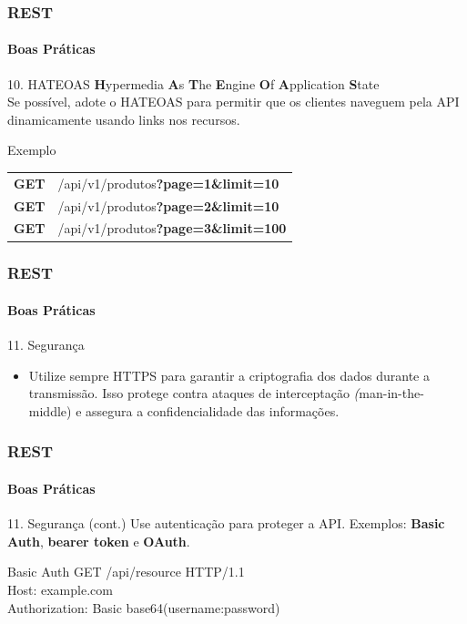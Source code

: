 \documentclass[
	10pt, %
	t, %
]{beamer}
\newcommand{\yellowbox}[1]{\colorbox{yellow!75}{#1}}
\begin{document}
\begin{frame}
	\frametitle{REST}
	\framesubtitle{Boas Práticas}

	\begin{block}{10. HATEOAS}
		\textbf{H}ypermedia \textbf{A}s \textbf{T}he \textbf{E}ngine \textbf{O}f \textbf{A}pplication \textbf{S}tate \\
		Se possível, adote o HATEOAS para permitir que os clientes naveguem pela API dinamicamente usando links nos recursos.
	\end{block}

	\begin{exampleblock}{Exemplo}
		\begin{tabular}{@{}ll@{}}
			\textbf{GET}    &  \yellowbox{/api/v1/produtos\textbf{?page=1\&limit=10}} \\
			\textbf{GET}    &  \yellowbox{/api/v1/produtos\textbf{?page=2\&limit=10}} \\
			\textbf{GET}    &  \yellowbox{/api/v1/produtos\textbf{?page=3\&limit=100}} \\
		\end{tabular}
	\end{exampleblock}

\end{frame}

\begin{frame}
	\frametitle{REST}
	\framesubtitle{Boas Práticas}
	
	\begin{block}{11. Segurança}
		\begin{itemize}
			\item Utilize sempre HTTPS para garantir a criptografia dos dados durante a transmissão. Isso protege contra ataques de interceptação \yellowbox{\textit(man-in-the-middle)} e assegura a confidencialidade das informações.
		\end{itemize}
	\end{block}

\end{frame}

\setcounter{footnote}{0}

\begin{frame}
	\frametitle{REST}
	\framesubtitle{Boas Práticas}
	
	\begin{block}{11. Segurança (cont.)}
		Use autenticação para proteger a API. Exemplos: 
		\textbf{Basic Auth}\footnotemark, 
		\textbf{bearer token} e 
		\textbf{OAuth}.
	\end{block}

	\begin{exampleblock}{Basic Auth}
		{ \small GET /api/resource HTTP/1.1 } \\
		{ \small Host: example.com } \\
		{ \small Authorization: Basic base64(username:password) } \\
	\end{exampleblock}


\end{frame}
\end{document}
